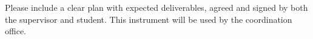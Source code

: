 Please include a clear plan with expected deliverables, agreed and signed by both the supervisor and student. This instrument will be used by the coordination office. 